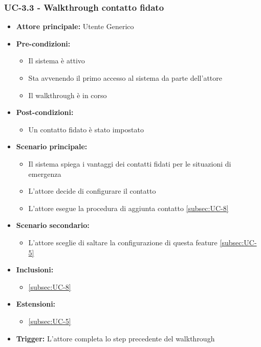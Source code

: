 \documentclass[a4paper,12pt]{article}
\begin{document}
\subsubsection{UC-3.3 - Walkthrough contatto fidato} \label{subsec:UC-3.3}
\begin{itemize}
    \item \textbf{Attore principale:} Utente Generico
    \item \textbf{Pre-condizioni:}
    \begin{itemize}
        \item Il sistema è attivo
        \item Sta avvenendo il primo accesso al sistema da parte dell'attore
        \item Il walkthrough è in corso
    \end{itemize}
    \item \textbf{Post-condizioni:}
    \begin{itemize}
        \item Un contatto fidato è stato impostato
    \end{itemize}
    \item \textbf{Scenario principale:}
    \begin{itemize}
        \item Il sistema spiega i vantaggi dei contatti fidati per le situazioni di emergenza
        \item L'attore decide di configurare il contatto
        \item L'attore esegue la procedura di aggiunta contatto \ref{subsec:UC-8}
    \end{itemize}
    \item \textbf{Scenario secondario:}
    \begin{itemize}
        \item L'attore sceglie di saltare la configurazione di questa feature \ref{subsec:UC-5}
    \end{itemize}
    \item \textbf{Inclusioni:}
    \begin{itemize}
        \item \ref{subsec:UC-8}
    \end{itemize}
    \item \textbf{Estensioni:}
    \begin{itemize}
        \item \ref{subsec:UC-5}
    \end{itemize}
    \item \textbf{Trigger:} L'attore completa lo step precedente del walkthrough
\end{itemize}
\end{document}
